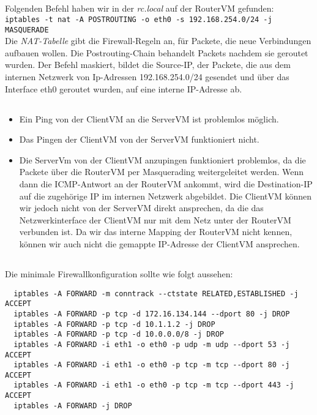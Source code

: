 \documentclass{scrartcl}
\begin{document}
\begin{enumerate}[\bfseries 1.]
  \subsection{}
  \label{sub:3.1}
  Folgenden Befehl haben wir in der \textit{rc.local} auf der RouterVM gefunden:\\
  \texttt{iptables -t nat -A POSTROUTING -o eth0 -s 192.168.254.0/24 -j MASQUERADE}\\
  Die \textit{NAT-Tabelle} gibt die Firewall-Regeln an, für Packete, die neue
  Verbindungen aufbauen wollen. Die Postrouting-Chain behandelt Packets nachdem
  sie geroutet wurden. Der Befehl maskiert, bildet die Source-IP, der Packete,
  die aus dem internen Netzwerk von Ip-Adressen 192.168.254.0/24 gesendet und
  über das Interface eth0 geroutet wurden, auf eine interne IP-Adresse ab.

  \subsection{}
  \label{sub:3.2}
  \begin{itemize}
    \item Ein Ping von der ClientVM an die ServerVM ist problemlos möglich.
    \item Das Pingen der ClientVM von der ServerVM  funktioniert nicht.
    \item
    Die ServerVm von der ClientVM anzupingen funktioniert problemlos,
    da die Packete über die RouterVM per Masquerading weitergeleitet werden.
    Wenn dann die ICMP-Antwort an der RouterVM ankommt, wird die Destination-IP
    auf die zugehörige IP im internen Netzwerk abgebildet.
    Die ClientVM können wir jedoch nicht von der ServerVM direkt ansprechen, da
    die das Netzwerkinterface der ClientVM nur mit dem Netz unter der RouterVM
    verbunden ist. Da wir das interne Mapping der RouterVM nicht kennen, können
    wir auch nicht die gemappte IP-Adresse der ClientVM ansprechen.
  \end{itemize}

\subsection{}
\label{sub:3.3}
Die minimale Firewallkonfiguration sollte wie folgt aussehen:
\begin{lstlisting}
  iptables -A FORWARD -m conntrack --ctstate RELATED,ESTABLISHED -j ACCEPT
  iptables -A FORWARD -p tcp -d 172.16.134.144 --dport 80 -j DROP
  iptables -A FORWARD -p tcp -d 10.1.1.2 -j DROP
  iptables -A FORWARD -p tcp -d 10.0.0.0/8 -j DROP
  iptables -A FORWARD -i eth1 -o eth0 -p udp -m udp --dport 53 -j ACCEPT
  iptables -A FORWARD -i eth1 -o eth0 -p tcp -m tcp --dport 80 -j ACCEPT
  iptables -A FORWARD -i eth1 -o eth0 -p tcp -m tcp --dport 443 -j ACCEPT
  iptables -A FORWARD -j DROP
\end{lstlisting}


\end{enumerate}
\end{document}
